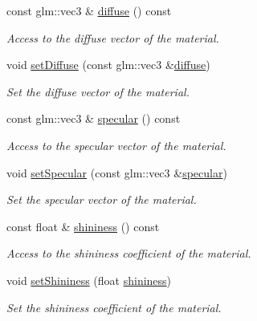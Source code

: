 \begin{DoxyCompactItemize}
const glm\+::vec3 \& \hyperlink{classMaterial_a20d17721220c394d517fba384376b28b}{diffuse} () const 
\begin{DoxyCompactList}\small\item\em Access to the diffuse vector of the material. \end{DoxyCompactList}\item 
void \hyperlink{classMaterial_abd6fd16afb939e1d69f4008c5491d6ed}{set\+Diffuse} (const glm\+::vec3 \&\hyperlink{classMaterial_a20d17721220c394d517fba384376b28b}{diffuse})
\begin{DoxyCompactList}\small\item\em Set the diffuse vector of the material. \end{DoxyCompactList}\item 
const glm\+::vec3 \& \hyperlink{classMaterial_abf83bcfb75295d0b666766b2b3e0150f}{specular} () const 
\begin{DoxyCompactList}\small\item\em Access to the specular vector of the material. \end{DoxyCompactList}\item 
void \hyperlink{classMaterial_a185716fb9befcf05ac127ece0fe35e6c}{set\+Specular} (const glm\+::vec3 \&\hyperlink{classMaterial_abf83bcfb75295d0b666766b2b3e0150f}{specular})
\begin{DoxyCompactList}\small\item\em Set the specular vector of the material. \end{DoxyCompactList}\item 
const float \& \hyperlink{classMaterial_a115afa4cab211d366e96ad1e01dd5eed}{shininess} () const 
\begin{DoxyCompactList}\small\item\em Access to the shininess coefficient of the material. \end{DoxyCompactList}\item 
void \hyperlink{classMaterial_a329d0ae8403956a71b1d45b3284f7dd7}{set\+Shininess} (float \hyperlink{classMaterial_a115afa4cab211d366e96ad1e01dd5eed}{shininess})
\begin{DoxyCompactList}\small\item\em Set the shininess coefficient of the material. \end{DoxyCompactList}\end{DoxyCompactItemize}
